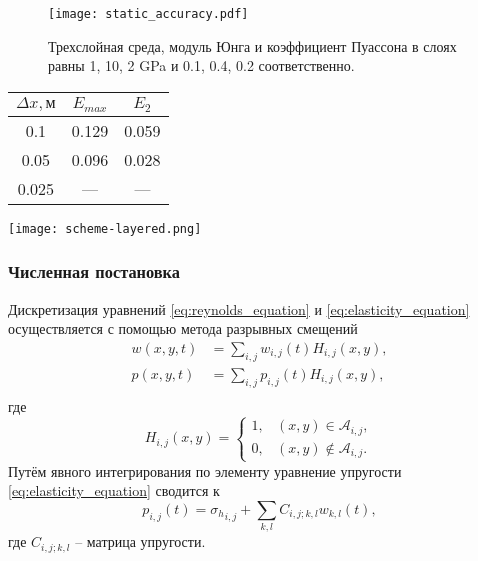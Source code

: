 \begin{frame}
    \centering
    \begin{figure}
        \texttt{[image: static\_accuracy.pdf]}
        \caption{\footnotesize{Трехслойная среда, модуль Юнга и коэффициент Пуассона в слоях равны 1, 10, 2 GPa и 0.1, 0.4, 0.2 соответственно.}}
    \end{figure}

    \begin{tabular}{|c|c|c|}
        \hline
        $\Delta x, \text{м}$ & $E_{max}$ & $E_2$ \\
        \hline
        0.1                     & 0.129     & 0.059 \\
        \hline
        0.05                    & 0.096     & 0.028 \\
        \hline
        0.025 & --- & --- \\
        \hline
    \end{tabular}
\end{frame}

\begin{frame}
    \centering
    \texttt{[image: scheme-layered.png]}
\end{frame}

\begin{frame}
    \frametitle{Численная постановка}
    Дискретизация уравнений \eqref{eq:reynolds_equation} и \eqref{eq:elasticity_equation} осуществляется с помощью метода разрывных смещений
    \begin{equation}
        \label{eq:piecewiece_approximation}
        \begin{split}
            w(x,y,t) &= \sum\limits_{i,j} w_{i,j}(t) H_{i,j}(x,y), \\
            p(x,y,t) &= \sum\limits_{i,j} p_{i,j}(t) H_{i,j}(x,y), \\
        \end{split}
    \end{equation}
    где 
    \begin{equation}
        \label{eq:heaviside_function}
        H_{i,j}(x,y) = \left\{
            \begin{array}{ll}
                1, & (x,y) \in \mathcal{A}_{i,j}, \\
                0, & (x,y) \notin \mathcal{A}_{i,j}.
            \end{array}\right.
    \end{equation}
    Путём явного интегрирования по элементу уравнение упругости \eqref{eq:elasticity_equation} сводится к
    \begin{equation}
        \label{eq:discrete_elasticity}
        p_{i,j}(t) = {\sigma_h}_{i,j} + \sum\limits_{k,l} C_{i,j;k,l} w_{k,l}(t),
    \end{equation}
    где $C_{i,j;k,l}$ -- матрица упругости.
\end{frame}

